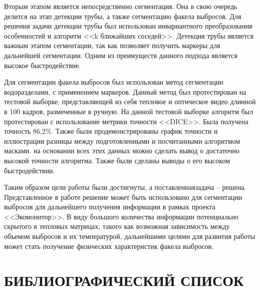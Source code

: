 \documentclass[14pt, a4paper]{extreport}
\begin{document}
	Вторым этапом является непосредственно сегментация. Она в свою очередь делится на этап детекции трубы, а также сегментацию факела выбросов. Для решения задачи детекции трубы был использован инвариантного преобразования особенностей и алгоритм <<k ближайших соседей>>. Детекция трубы является важным этапом сегментации, так как позволяет получить маркеры для дальнейшей сегментации. Одним из преимуществ данного подхода является высокое быстродействие.
	
	Для сегментации факела выбросов был использован метод сегментации водоразделами, с применением маркеров. Данный метод был протестирован на тестовой выборке, представляющей из себя тепловое и оптическое видео длинной в 100 кадров, размеченные в ручную. На данной тестовой выборке алгоритм был протестирован с использование метрики точности <<DICE>>. Была получена точность 86,2\%. Также были продемонстрированы график точности и иллюстрации разницы между подготовленными и посчитанными алгоритмом масками. на основании всех этих данных можно сделать вывод о достаточно высокой точности алгоритма. Также были сделаны выводы о его высоком быстродействии.
	
	Таким образом цели работы были достигнуты, а поставленная\linebreak задача -- решена. Представленное в работе решение может быть использовано для сегментации выбросов для дальнейшего получения информации в рамках проекта <<Экомонитор>>. В виду большого количества информации потенциально скрытого в тепловых матрицах, такого как возможная зависимость между объемом выбросов и их температурой, дальнейшими целями для развития работы может стать получение физических характеристик факела выбросов.
	
	
\chapter*{БИБЛИОГРАФИЧЕСКИЙ СПИСОК}
	
\end{document}
